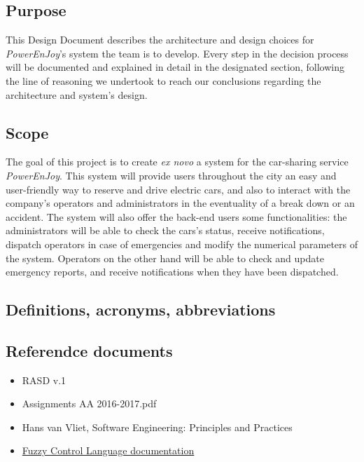 \subsection{Purpose}
This Design Document describes the architecture and design choices for \textit{PowerEnJoy}'s system the team is to develop. Every step in the decision process will be documented and explained in detail in the designated section, following the line of reasoning we undertook to reach our conclusions regarding the architecture and system's design.

\subsection{Scope}
The goal of this project is to create \textit{ex novo} a system for the car-sharing service \textit{PowerEnJoy}. This system will provide users throughout the city an easy and user-friendly way to reserve and drive electric cars, and also to interact with the company's operators and administrators in the eventuality of a break down or an accident. 
The system will also offer the back-end users some functionalities: the administrators will be able to check the cars's status, receive notifications, dispatch operators in case of emergencies and modify the numerical parameters of the system. Operators on the other hand will be able to check and update emergency reports, and receive notifications when they have been dispatched.

\subsection{Definitions, acronyms, abbreviations}
	

\subsection{Referendce documents}
	\begin{itemize}
		\item RASD v.1
		\item Assignments AA 2016-2017.pdf
		\item Hans van Vliet, Software Engineering: Principles and Practices
		\item \href{http://ffll.sourceforge.net/fcl.htm}{Fuzzy Control Language documentation}
	\end{itemize}

